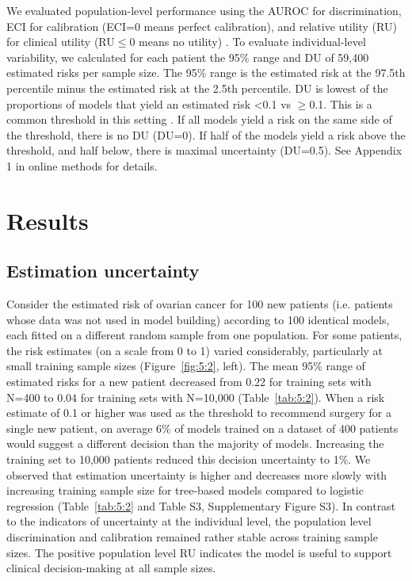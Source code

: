 We evaluated population-level performance using the \gls{AUROC} for discrimination, \gls{ECI} for calibration (\gls{ECI}=0 means perfect calibration), and relative utility (\gls{RU}) for clinical utility (\gls{RU}$\leq$0 means no utility) \cite{vanhoordeAssessingCalibrationMultinomial2014,bakerUsingRelativeUtility2009}. To evaluate individual-level variability, we calculated for each patient the 95\% range and \gls{DU} of 59,400 estimated risks per sample size. The 95\% range is the estimated risk at the 97.5th percentile minus the estimated risk at the 2.5th percentile. \gls{DU} is lowest of the proportions of models that yield an estimated risk \textless0.1 vs $\geq$0.1. This is a common threshold in this setting \cite{timmermanESGOISUOGIOTA2021}. If all models yield a risk on the same side of the threshold, there is no \gls{DU} (\gls{DU}=0). If half of the models yield a risk above the threshold, and half below, there is maximal uncertainty (\gls{DU}=0.5). See Appendix 1 in online methods for details.

\section{Results}

\subsection{Estimation uncertainty}

Consider the estimated risk of ovarian cancer for 100 new patients (i.e. patients whose data was not used in model building) according to 100 identical models, each fitted on a different random sample from one population. For some patients, the risk estimates (on a scale from 0 to 1) varied considerably, particularly at small training sample sizes (Figure~\ref{fig:5:2}, left). The mean 95\% range of estimated risks for a new patient decreased from 0.22 for training sets with N=400 to 0.04 for training sets with N=10,000 (Table~\ref{tab:5:2}). When a risk estimate of 0.1 or higher was used as the threshold to recommend surgery for a single new patient, on average 6\% of models trained on a dataset of 400 patients would suggest a different decision than the majority of models. Increasing the training set to 10,000 patients reduced this decision uncertainty to 1\%. We observed that estimation uncertainty is higher and decreases more slowly with increasing training sample size for tree-based models compared to logistic regression (Table~\ref{tab:5:2} and Table S3, Supplementary Figure S3). In contrast to the indicators of uncertainty at the individual level, the population level discrimination and calibration remained rather stable across training sample sizes. The positive population level \gls{RU} indicates the model is useful to support clinical decision-making at all sample sizes.

